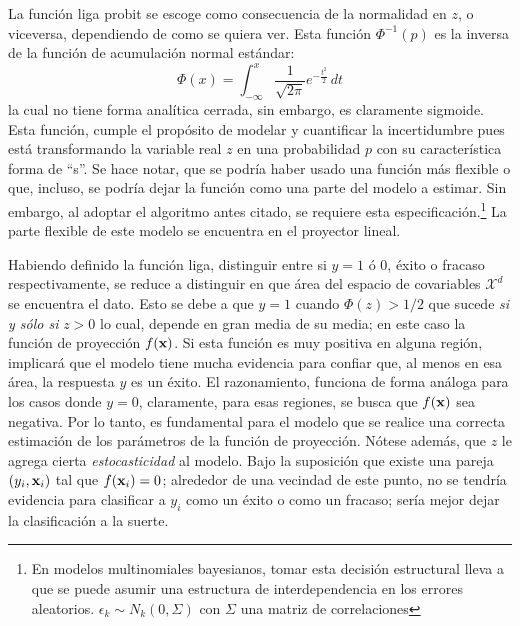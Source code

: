 \documentclass[../Main/Main.tex]{subfiles}
\begin{document}
La función liga probit se escoge como consecuencia de la normalidad en $z$, o viceversa, dependiendo de como se quiera ver. Esta función $\Phi^{-1}(p)$ es la inversa de la función de acumulación normal estándar:
$$\Phi(x) = \int_{-\infty}^x \dfrac{1}{\sqrt{2\pi}}e^{-\frac{t^2}{2}}\, dt$$
la cual no tiene forma analítica cerrada, sin embargo, es claramente sigmoide. Esta función, cumple el propósito de modelar y cuantificar la incertidumbre pues está transformando la variable real $z$ en una probabilidad $p$ con su característica forma de ``s''. Se hace notar, que se podría haber usado una función más flexible o que, incluso, se podría dejar la función como una parte del modelo a estimar. Sin embargo, al adoptar el algoritmo antes citado, se requiere esta especificación.\footnote{En modelos multinomiales bayesianos, tomar esta decisión estructural lleva a que se puede asumir una estructura de interdependencia en los errores aleatorios. $\epsilon_k \sim N_k(0, \Sigma)$ con $\Sigma$ una matriz de correlaciones} La parte flexible de este modelo se encuentra en el proyector lineal.

Habiendo definido la función liga, distinguir entre si $y = 1$ ó 0, éxito o fracaso respectivamente, se reduce a distinguir en que área del espacio de covariables $\mathcal{X}^d$ se encuentra el dato. Esto se debe a que $y = 1$ cuando $\Phi(z) > 1/2$ que sucede \textit{si y sólo si} $z>0$ lo cual, depende en gran media de su media; en este caso la función de proyección $f(\mathbf{x})$. Si esta función es muy positiva en alguna región, implicará que el modelo tiene mucha evidencia para confiar que, al menos en esa área, la respuesta $y$ es un éxito. El razonamiento, funciona de forma análoga para los casos donde $y = 0$, claramente, para esas regiones, se busca que $f(\mathbf{x})$ sea negativa. Por lo tanto, es fundamental para el modelo que se realice una correcta estimación de los parámetros de la función de proyección.  Nótese además, que $z$ le agrega cierta \textit{estocasticidad} al modelo. Bajo la suposición que existe una pareja $(y_i,\mathbf{x}_i)$ tal que $f(\mathbf{x}_i) = 0$; alrededor de una vecindad de este punto, no se tendría evidencia para clasificar a $y_i$ como un éxito o como un fracaso; sería mejor dejar la clasificación a la suerte.
\end{document}
